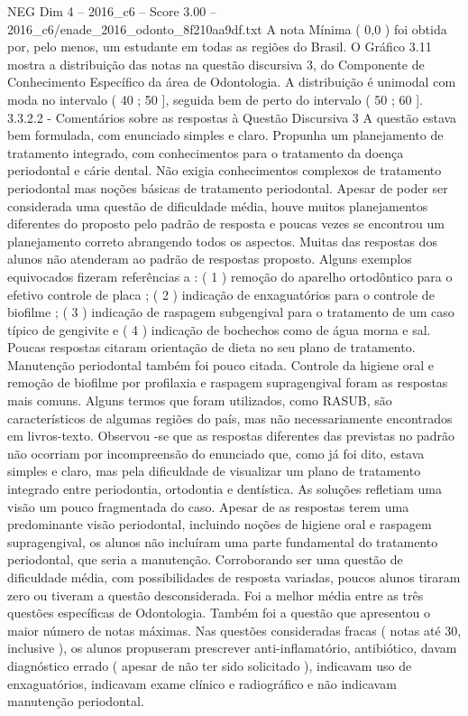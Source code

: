 \begin{textsample}{NEG Dim 4 – 2016\_c6 – Score 3.00 – 2016\_c6/enade\_2016\_odonto\_8f210aa9df.txt}
A nota Mínima ( 0,0 ) foi obtida por, pelo menos, um estudante em todas as regiões do Brasil.
O Gráfico 3.11 mostra a distribuição das notas na questão discursiva 3, do Componente de Conhecimento Específico da área de Odontologia.
A distribuição é unimodal com moda no intervalo ( 40 ; 50 ], seguida bem de perto do intervalo ( 50 ; 60 ]. 3.3.2.2 - Comentários sobre as respostas à Questão Discursiva 3 A questão estava bem formulada, com enunciado simples e claro.
Propunha um planejamento de tratamento integrado, com conhecimentos para o tratamento da doença periodontal e cárie dental.
Não exigia conhecimentos complexos de tratamento periodontal mas noções básicas de tratamento periodontal.
Apesar de poder ser considerada uma questão de dificuldade média, houve muitos planejamentos diferentes do proposto pelo padrão de resposta e poucas vezes se encontrou um planejamento correto abrangendo todos os aspectos.
Muitas das respostas dos alunos não atenderam ao padrão de respostas proposto.
Alguns exemplos equivocados fizeram referências a : ( 1 ) remoção do aparelho ortodôntico para o efetivo controle de placa ; ( 2 ) indicação de enxaguatórios para o controle de biofilme ; ( 3 ) indicação de raspagem subgengival para o tratamento de um caso típico de gengivite e ( 4 ) indicação de bochechos como de água morna e sal.
Poucas respostas citaram orientação de dieta no seu plano de tratamento.
Manutenção periodontal também foi pouco citada.
Controle da higiene oral e remoção de biofilme por profilaxia e raspagem supragengival foram as respostas mais comuns.
Alguns termos que foram utilizados, como RASUB, são característicos de algumas regiões do país, mas não necessariamente encontrados em livros-texto.
Observou -se que as respostas diferentes das previstas no padrão não ocorriam por incompreensão do enunciado que, como já foi dito, estava simples e claro, mas pela dificuldade de visualizar um plano de tratamento integrado entre periodontia, ortodontia e dentística.
As soluções refletiam uma visão um pouco fragmentada do caso.
Apesar de as respostas terem uma predominante visão periodontal, incluindo noções de higiene oral e raspagem supragengival, os alunos não incluíram uma parte fundamental do tratamento periodontal, que seria a manutenção.
Corroborando ser uma questão de dificuldade média, com possibilidades de resposta variadas, poucos alunos tiraram zero ou tiveram a questão desconsiderada.
Foi a melhor média entre as três questões específicas de Odontologia.
Também foi a questão que apresentou o maior número de notas máximas.
Nas questões consideradas fracas ( notas até 30, inclusive ), os alunos propuseram prescrever anti-inflamatório, antibiótico, davam diagnóstico errado ( apesar de não ter sido solicitado ), indicavam uso de enxaguatórios, indicavam exame clínico e radiográfico e não indicavam manutenção periodontal.

\end{textsample}
